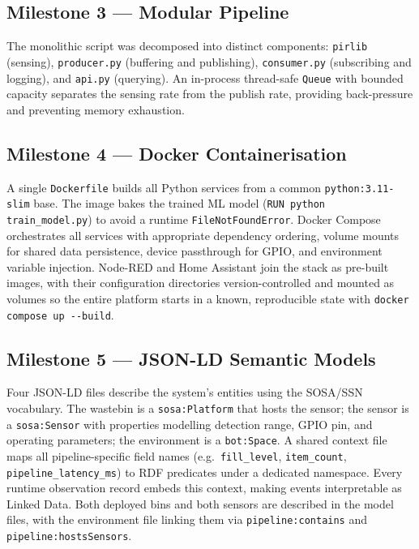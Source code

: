 \documentclass[10pt,a4paper]{article}
\begin{document}
\subsection{Milestone 3 --- Modular Pipeline}

The monolithic script was decomposed into distinct components: \texttt{pirlib}
(sensing), \texttt{producer.py} (buffering and publishing), \texttt{consumer.py}
(subscribing and logging), and \texttt{api.py} (querying). An in-process thread-safe
\texttt{Queue} with bounded capacity separates the sensing rate from the publish rate,
providing back-pressure and preventing memory exhaustion.

\subsection{Milestone 4 --- Docker Containerisation}

A single \texttt{Dockerfile} builds all Python services from a common \texttt{python:3.11-slim}
base. The image bakes the trained ML model (\texttt{RUN python train\_model.py}) to
avoid a runtime \texttt{FileNotFoundError}. Docker Compose orchestrates all services with appropriate dependency ordering, volume mounts for shared data persistence,
device passthrough for GPIO, and environment variable injection. Node-RED and Home Assistant join the stack as pre-built images, with their configuration directories version-controlled and mounted as volumes so the entire platform starts in a known, reproducible state with \texttt{docker compose up -{}-build}.

\subsection{Milestone 5 --- JSON-LD Semantic Models}

Four JSON-LD files describe the system's entities using the SOSA/SSN vocabulary. The
wastebin is a \texttt{sosa:Platform} that hosts the sensor; the sensor is a
\texttt{sosa:Sensor} with properties modelling detection range, GPIO pin, and operating
parameters; the environment is a \texttt{bot:Space}. A shared context file maps all
pipeline-specific field names (e.g.\ \texttt{fill\_level}, \texttt{item\_count},
\texttt{pipeline\_latency\_ms}) to RDF predicates under a dedicated namespace. Every
runtime observation record embeds this context, making events interpretable as Linked
Data. Both deployed bins and both sensors are described in the model files, with the environment file linking them via \texttt{pipeline:contains} and \texttt{pipeline:hostsSensors}.
\end{document}
